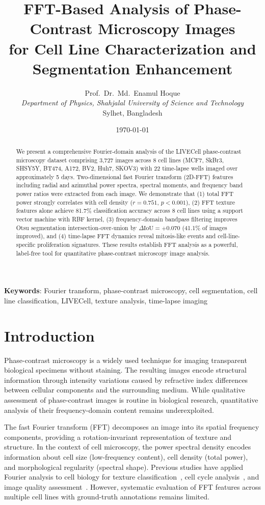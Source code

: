 \documentclass[11pt,a4paper]{article}
\title{\textbf{FFT-Based Analysis of Phase-Contrast Microscopy Images\\
for Cell Line Characterization and Segmentation Enhancement}}
\author{Prof.\ Dr.\ Md.\ Enamul Hoque\\
\textit{Department of Physics, Shahjalal University of Science and Technology}\\
Sylhet, Bangladesh}
\date{\today}
\begin{document}
\maketitle

\begin{abstract}
We present a comprehensive Fourier-domain analysis of the LIVECell phase-contrast
microscopy dataset comprising 3,727 images across 8 cell lines (MCF7, SkBr3, SHSY5Y,
BT474, A172, BV2, Huh7, SKOV3) with 22 time-lapse wells imaged over approximately
5 days. Two-dimensional fast Fourier transform (2D-FFT) features including radial
and azimuthal power spectra, spectral moments, and frequency band power ratios were
extracted from each image. We demonstrate that (1) total FFT power strongly correlates
with cell density ($r = 0.751$, $p < 0.001$), (2) FFT texture features alone achieve
81.7\% classification accuracy across 8 cell lines using a support vector machine with
RBF kernel, (3) frequency-domain bandpass filtering improves Otsu segmentation
intersection-over-union by $\Delta\text{IoU} = +0.070$ (41.1\% of images improved),
and (4) time-lapse FFT dynamics reveal mitosis-like events and cell-line-specific
proliferation signatures. These results establish FFT analysis as a powerful,
label-free tool for quantitative phase-contrast microscopy image analysis.
\end{abstract}

\textbf{Keywords}: Fourier transform, phase-contrast microscopy, cell segmentation,
cell line classification, LIVECell, texture analysis, time-lapse imaging

\section{Introduction}

Phase-contrast microscopy is a widely used technique for imaging transparent
biological specimens without staining. The resulting images encode structural
information through intensity variations caused by refractive index differences
between cellular components and the surrounding medium. While qualitative
assessment of phase-contrast images is routine in biological research,
quantitative analysis of their frequency-domain content remains underexploited.

The fast Fourier transform (FFT) decomposes an image into its spatial frequency
components, providing a rotation-invariant representation of texture and structure.
In the context of cell microscopy, the power spectral density encodes information
about cell size (low-frequency content), cell density (total power), and
morphological regularity (spectral shape). Previous studies have applied Fourier
analysis to cell biology for texture classification~\cite{castleman1979},
cell cycle analysis~\cite{lloyd1993}, and image quality
assessment~\cite{bray2012}. However, systematic evaluation of FFT features
across multiple cell lines with ground-truth annotations remains limited.
\end{document}
